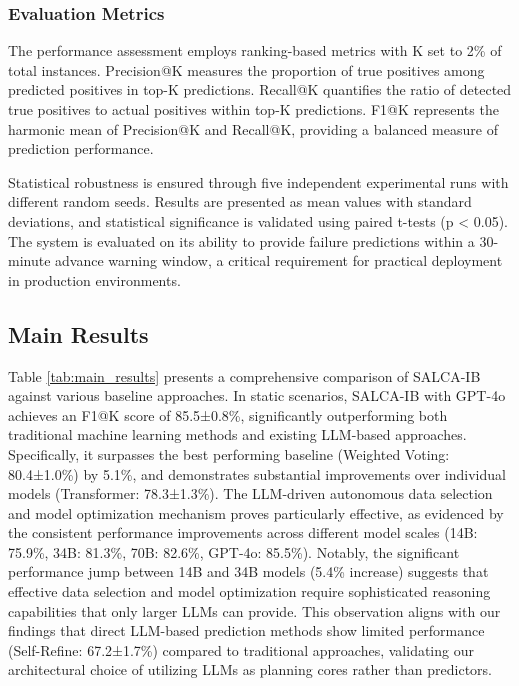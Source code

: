 \documentclass[conference]{IEEEtran}
\begin{document}
\subsubsection{Evaluation Metrics}
The performance assessment employs ranking-based metrics with K set to 2\% of total instances. Precision@K measures the proportion of true positives among predicted positives in top-K predictions. Recall@K quantifies the ratio of detected true positives to actual positives within top-K predictions. F1@K represents the harmonic mean of Precision@K and Recall@K, providing a balanced measure of prediction performance.

Statistical robustness is ensured through five independent experimental runs with different random seeds. Results are presented as mean values with standard deviations, and statistical significance is validated using paired t-tests (p < 0.05). The system is evaluated on its ability to provide failure predictions within a 30-minute advance warning window, a critical requirement for practical deployment in production environments.


\subsection{Main Results}
Table \ref{tab:main_results} presents a comprehensive comparison of SALCA-IB against various baseline approaches. In static scenarios, SALCA-IB with GPT-4o achieves an F1@K score of 85.5±0.8\%, significantly outperforming both traditional machine learning methods and existing LLM-based approaches. Specifically, it surpasses the best performing baseline (Weighted Voting: 80.4±1.0\%) by 5.1\%, and demonstrates substantial improvements over individual models (Transformer: 78.3±1.3\%). The LLM-driven autonomous data selection and model optimization mechanism proves particularly effective, as evidenced by the consistent performance improvements across different model scales (14B: 75.9\%, 34B: 81.3\%, 70B: 82.6\%, GPT-4o: 85.5\%). Notably, the significant performance jump between 14B and 34B models (5.4\% increase) suggests that effective data selection and model optimization require sophisticated reasoning capabilities that only larger LLMs can provide. This observation aligns with our findings that direct LLM-based prediction methods show limited performance (Self-Refine: 67.2±1.7\%) compared to traditional approaches, validating our architectural choice of utilizing LLMs as planning cores rather than predictors.
\end{document}
